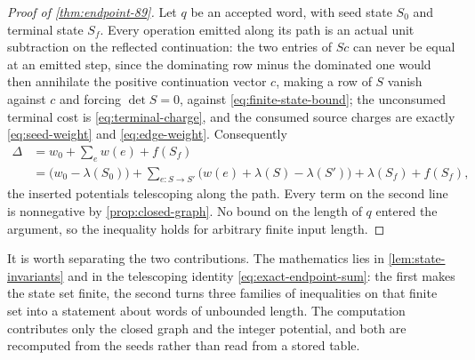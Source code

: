 \begin{proof}[Proof of \cref{thm:endpoint-89}]
Let $q$ be an accepted word, with seed state $S_0$ and terminal state
$S_f$. Every operation emitted along its path is an actual unit
subtraction on the reflected continuation: the two entries of $Sc$ can
never be equal at an emitted step, since the dominating row minus the
dominated one would then annihilate the positive continuation vector $c$,
making a row of $S$ vanish against $c$ and forcing $\det S=0$, against
\eqref{eq:finite-state-bound}; the unconsumed terminal cost is
\eqref{eq:terminal-charge}, and the consumed source charges are exactly
\eqref{eq:seed-weight} and \eqref{eq:edge-weight}. Consequently
\begin{equation}
 \begin{aligned}
 \Delta
 &=w_0+\sum_e w(e)+f(S_f)\\
 &=\bigl(w_0-\lambda(S_0)\bigr)
   +\sum_{e:S\to S'}\bigl(w(e)+\lambda(S)-\lambda(S')\bigr)
   +\lambda(S_f)+f(S_f),
 \end{aligned}
 \label{eq:exact-endpoint-sum}
\end{equation}
the inserted potentials telescoping along the path. Every term on the
second line is nonnegative by \cref{prop:closed-graph}. No bound on the
length of $q$ entered the argument, so the inequality holds for arbitrary
finite input length.
\end{proof}

\begin{remark}
\label{rem:role-of-the-computation}
It is worth separating the two contributions. The mathematics lies in
\cref{lem:state-invariants} and in the telescoping identity
\eqref{eq:exact-endpoint-sum}: the first makes the state set finite, the
second turns three families of inequalities on that finite set into a
statement about words of unbounded length. The computation contributes
only the closed graph and the integer potential, and both are recomputed
from the seeds rather than read from a stored table.
\end{remark}
